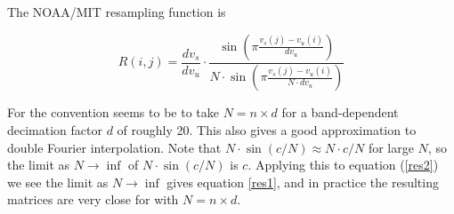 \documentclass[12pt]{article}
\begin{document}

The NOAA/MIT {\cris} resampling function is

\begin{equation}\label{res2}
  R(i,j) = \frac{dv_s}{dv_u}\cdot
     \frac{\sin(\displaystyle \pi \frac{v_s(j) - v_u(i)}{dv_u})}
  {N \cdot \sin(\displaystyle \pi \frac{v_s(j) - v_u(i)}{N \cdot dv_u})}
\end{equation} 

\noindent
For {\cris} the convention seems to be to take $N = n \times d$ for
a band-dependent decimation factor $d$ of roughly 20.  This also
gives a good approximation to double Fourier interpolation.  Note
that $N\cdot \sin(c/N) \approx N \cdot c/N$ for large $N$, so the
limit as $N\rightarrow\inf$ of $N\cdot \sin(c/N)$ is $c$.  Applying
this to equation (\ref{res2}) we see the limit as $N\rightarrow\inf$
gives equation \ref{res1}, and in practice the resulting matrices
are very close for {\cris} with $N = n \times d$.

\end{document}
